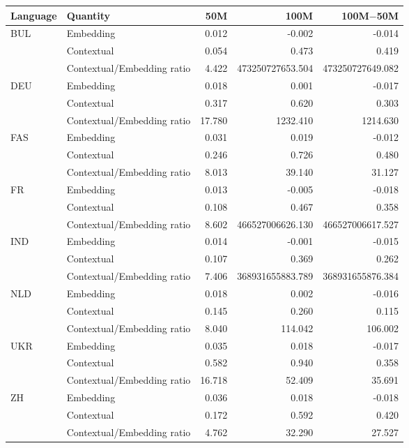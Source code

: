 \begin{tabular}{@{}llrrr@{}}
\toprule
Language & Quantity & 50M & 100M & 100M$-$50M \\
\midrule
BUL & Embedding & 0.012 & -0.002 & -0.014 \\
 & Contextual & 0.054 & 0.473 & 0.419 \\
 & Contextual/Embedding ratio & 4.422 & 473250727653.504 & 473250727649.082 \\
\cmidrule(lr){1-5}
DEU & Embedding & 0.018 & 0.001 & -0.017 \\
 & Contextual & 0.317 & 0.620 & 0.303 \\
 & Contextual/Embedding ratio & 17.780 & 1232.410 & 1214.630 \\
\cmidrule(lr){1-5}
FAS & Embedding & 0.031 & 0.019 & -0.012 \\
 & Contextual & 0.246 & 0.726 & 0.480 \\
 & Contextual/Embedding ratio & 8.013 & 39.140 & 31.127 \\
\cmidrule(lr){1-5}
FR & Embedding & 0.013 & -0.005 & -0.018 \\
 & Contextual & 0.108 & 0.467 & 0.358 \\
 & Contextual/Embedding ratio & 8.602 & 466527006626.130 & 466527006617.527 \\
\cmidrule(lr){1-5}
IND & Embedding & 0.014 & -0.001 & -0.015 \\
 & Contextual & 0.107 & 0.369 & 0.262 \\
 & Contextual/Embedding ratio & 7.406 & 368931655883.789 & 368931655876.384 \\
\cmidrule(lr){1-5}
NLD & Embedding & 0.018 & 0.002 & -0.016 \\
 & Contextual & 0.145 & 0.260 & 0.115 \\
 & Contextual/Embedding ratio & 8.040 & 114.042 & 106.002 \\
\cmidrule(lr){1-5}
UKR & Embedding & 0.035 & 0.018 & -0.017 \\
 & Contextual & 0.582 & 0.940 & 0.358 \\
 & Contextual/Embedding ratio & 16.718 & 52.409 & 35.691 \\
\cmidrule(lr){1-5}
ZH & Embedding & 0.036 & 0.018 & -0.018 \\
 & Contextual & 0.172 & 0.592 & 0.420 \\
 & Contextual/Embedding ratio & 4.762 & 32.290 & 27.527 \\
\bottomrule
\end{tabular}
